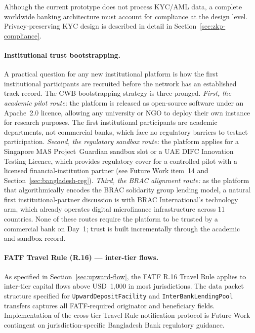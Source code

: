 \documentclass[12pt,a4paper]{report}
\begin{document}
Although the current prototype does not process KYC/AML data, a complete worldwide banking architecture must account for compliance at the design level. Privacy-preserving KYC design is described in detail in Section~\ref{sec:zkp-compliance}.

\paragraph{Institutional trust bootstrapping.}
A practical question for any new institutional platform is how the first institutional participants are recruited before the network has an established track record. The CWB bootstrapping strategy is three-pronged. \textit{First, the academic pilot route:} the platform is released as open-source software under an Apache~2.0 licence, allowing any university or NGO to deploy their own instance for research purposes. The first institutional participants are academic departments, not commercial banks, which face no regulatory barriers to testnet participation. \textit{Second, the regulatory sandbox route:} the platform applies for a Singapore MAS Project~Guardian sandbox slot or a UAE DIFC Innovation Testing Licence, which provides regulatory cover for a controlled pilot with a licensed financial-institution partner (see Future Work item~14 and Section~\ref{sec:bangladesh-reg}). \textit{Third, the BRAC alignment route:} as the platform that algorithmically encodes the BRAC solidarity group lending model, a natural first institutional-partner discussion is with BRAC International's technology arm, which already operates digital microfinance infrastructure across 11 countries. None of these routes require the platform to be trusted by a commercial bank on Day~1; trust is built incrementally through the academic and sandbox record.

\paragraph{FATF Travel Rule (R.16) --- inter-tier flows.}
As specified in Section~\ref{sec:upward-flow}, the FATF R.16 Travel Rule applies to inter-tier capital flows above USD~1,000 in most jurisdictions. The data packet structure specified for \texttt{UpwardDepositFacility} and \texttt{InterBankLendingPool} transfers captures all FATF-required originator and beneficiary fields. Implementation of the cross-tier Travel Rule notification protocol is Future Work contingent on jurisdiction-specific Bangladesh Bank regulatory guidance.
\end{document}
